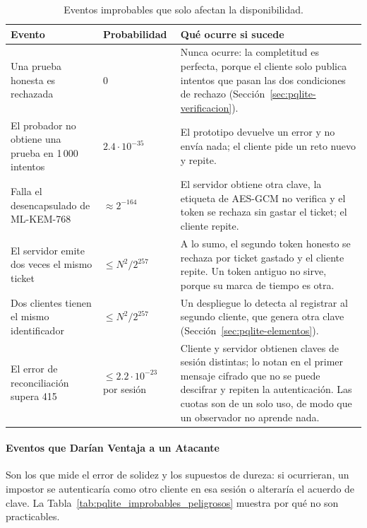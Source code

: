 \begin{table}[H]
\centering
\caption{Eventos improbables que solo afectan la disponibilidad.}
\label{tab:pqlite_improbables_inocuos}
\small
\begin{tabularx}{\textwidth}{>{\raggedright\arraybackslash}p{4.0cm}>{\raggedright\arraybackslash}p{3.3cm}Y}
\toprule
\textbf{Evento} & \textbf{Probabilidad} & \textbf{Qué ocurre si sucede} \\
\midrule
Una prueba honesta es rechazada & $0$ & Nunca ocurre: la completitud es perfecta, porque el cliente solo publica intentos que pasan las dos condiciones de rechazo (Sección~\ref{sec:pqlite-verificacion}). \\
El probador no obtiene una prueba en 1\,000 intentos & $2.4 \cdot 10^{-35}$ & El prototipo devuelve un error y no envía nada; el cliente pide un reto nuevo y repite. \\
Falla el desencapsulado de ML-KEM-768 & $\approx 2^{-164}$ \cite{avanzi2021kyber} & El servidor obtiene otra clave, la etiqueta de AES-GCM no verifica y el token se rechaza sin gastar el ticket; el cliente repite. \\
El servidor emite dos veces el mismo ticket & $\le N^2/2^{257}$ & A lo sumo, el segundo token honesto se rechaza por ticket gastado y el cliente repite. Un token antiguo no sirve, porque su marca de tiempo es otra. \\
Dos clientes tienen el mismo identificador & $\le N^2/2^{257}$ & Un despliegue lo detecta al registrar al segundo cliente, que genera otra clave (Sección~\ref{sec:pqlite-elementos}). \\
El error de reconciliación supera 415 & $\le 2.2 \cdot 10^{-23}$ por sesión & Cliente y servidor obtienen claves de sesión distintas; lo notan en el primer mensaje cifrado que no se puede descifrar y repiten la autenticación. Las cuotas son de un solo uso, de modo que un observador no aprende nada. \\
\bottomrule
\end{tabularx}
\end{table}

\paragraph{Eventos que Darían Ventaja a un Atacante}
Son los que mide el error de solidez y los supuestos de dureza: si ocurrieran, un impostor se autenticaría como otro cliente en esa sesión o alteraría el acuerdo de clave. La Tabla~\ref{tab:pqlite_improbables_peligrosos} muestra por qué no son practicables.

